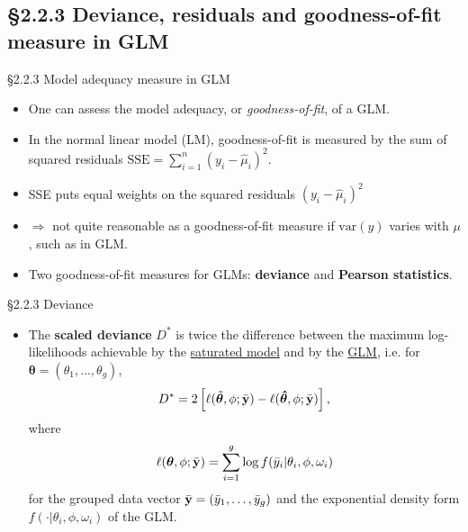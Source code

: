 \documentclass{beamer}
\newcommand{\currentsubsection}{}
\let\oldsubsection\subsection
\renewcommand{\subsection}[1]{\oldsubsection{#1}\renewcommand{\currentsubsection}{#1}}
\newcommand{\boldtheta}{{\boldsymbol \theta}}
\newenvironment{wideitemize}%
  {\begin{itemize}%
    \setlength{\parskip}{1em}}%
  {\end{itemize}}
\begin{document}
\subsection{\S2.2.3 Deviance, residuals and goodness-of-fit measure in GLM} \label{sec:2.2.3}

\begin{frame} {\S2.2.3 Model adequacy measure in GLM}
\begin{wideitemize}
\item One can assess the model adequacy, or \emph{goodness-of-fit},  of a GLM. 

\item
In the normal linear model (LM), goodness-of-fit  is measured by the sum of squared residuals 
$\mbox{SSE}\!=\!\sum_{i=1}^n(y_i-\hat{\mu}_i)^2$. 

\item SSE puts equal weights on the squared residuals $(y_i-\hat{\mu}_i)^2$

\item $\Rightarrow$ not quite reasonable as a goodness-of-fit measure if $\mbox{var}(y)$ 
varies with $\mu$, such as in GLM.

\item Two goodness-of-fit measures for GLMs: {\bf deviance} and {\bf Pearson statistics}.
\end{wideitemize}
\end{frame}


\begin{frame}{\S2.2.3 Deviance }
\begin{itemize}

\item
The {\bf scaled deviance} $D^*$ is twice the difference between the maximum log-likelihoods achievable by the \underline{saturated model} and by
the \underline{GLM}, i.e. for $\boldtheta = (\theta_1, \dots, \theta_g)$,
\[
D^*=2\left[\ell(\tilde{\boldtheta},\phi ; \bar{\bf y})
-\ell(\mbox{\boldmath $\hat{\theta}$},\phi ; \bar{\bf y})\right],
\]
where
\[
\ell({\boldsymbol \theta}, \phi; \bar{\bf y}) = \sum_{i =1}^g \log f( \bar{y}_i |\theta_i, \phi, \omega_i)
\]
for the grouped data vector $\bar{\bf y} = (\bar{y}_1, \dots, \bar{y}_g)$ and the exponential density form $f( \cdot |\theta_i, \phi, \omega_i)$ of the GLM.





\end{itemize}
\end{frame}
\end{document}
